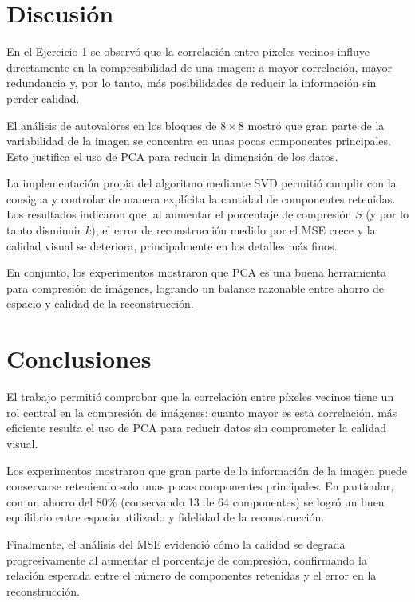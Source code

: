 \documentclass[12pt]{article}
\begin{document}
\section{Discusión}
En el Ejercicio 1 se observó que la correlación entre píxeles vecinos influye directamente en la compresibilidad de una imagen: a mayor correlación, mayor redundancia y, por lo tanto, más posibilidades de reducir la información sin perder calidad.

El análisis de autovalores en los bloques de \(8 \times 8\) mostró que gran parte de la variabilidad de la imagen se concentra en unas pocas componentes principales. Esto justifica el uso de PCA para reducir la dimensión de los datos.

La implementación propia del algoritmo mediante SVD permitió cumplir con la consigna y controlar de manera explícita la cantidad de componentes retenidas. Los resultados indicaron que, al aumentar el porcentaje de compresión \(S\) (y por lo tanto disminuir \(k\)), el error de reconstrucción medido por el MSE crece y la calidad visual se deteriora, principalmente en los detalles más finos.

En conjunto, los experimentos mostraron que PCA es una buena herramienta para compresión de imágenes, logrando un balance razonable entre ahorro de espacio y calidad de la reconstrucción.


\section{Conclusiones}
El trabajo permitió comprobar que la correlación entre píxeles vecinos tiene un rol central en la compresión de imágenes: cuanto mayor es esta correlación, más eficiente resulta el uso de PCA para reducir datos sin comprometer la calidad visual. 

Los experimentos mostraron que gran parte de la información de la imagen puede conservarse reteniendo solo unas pocas componentes principales. En particular, con un ahorro del 80\% (conservando 13 de 64 componentes) se logró un buen equilibrio entre espacio utilizado y fidelidad de la reconstrucción. 

Finalmente, el análisis del MSE evidenció cómo la calidad se degrada progresivamente al aumentar el porcentaje de compresión, confirmando la relación esperada entre el número de componentes retenidas y el error en la reconstrucción.
\end{document}
